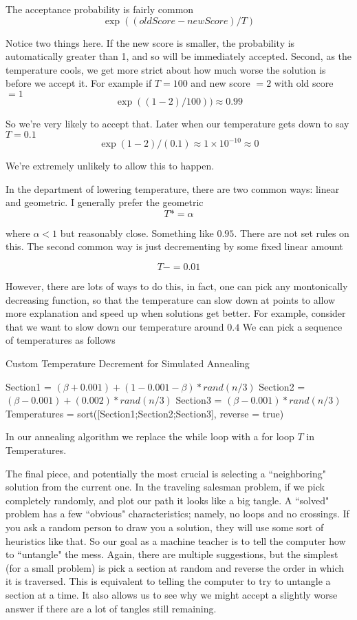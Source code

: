 \documentclass{article}
\theoremstyle{definition}
\theoremstyle{remark}
\begin{document}
The acceptance probability is fairly common
\[
\exp((oldScore - newScore)/T)
\]

Notice two things here.  If the new score is smaller, the probability is automatically greater than 1, and so will be immediately accepted.  Second, as the temperature cools, we get more strict about how much worse the solution is before we accept it.
For example if $T = 100$ and new score $=2$ with old score $=1$
\[
\exp((1-2)/100)) \approx 0.99
\]

So we're very likely to accept that.  Later when our temperature gets down to say $T = 0.1$
\[
\exp(1-2)/(0.1)  \approx 1\times 10^{-10} \approx 0
\]

We're extremely unlikely to allow this to happen.


In the department of lowering temperature, there are two common ways: linear and geometric.  I generally prefer the geometric
\[
T *= \alpha
\]

where $\alpha < 1$ but reasonably close.  Something like $0.95$.  There are not set rules on this.  The second common way is just decrementing by some fixed linear amount

\[
T -= 0.01
\]


However, there are lots of ways to do this, in fact, one can pick any montonically decreasing function, so that the temperature can slow down at points to allow more explanation and speed up when solutions get better. For example, consider that we want to slow down our temperature around $0.4$  We can pick a sequence of temperatures as follows

\begin{algorithm}
	\caption{Custom Temperature Decrement for Simulated Annealing}
	\label{Custom Temperature}
	\begin{algorithmic}[1]
		\State Section1 = $(\beta + 0.001) + (1 - 0.001 - \beta)*rand(n/3)$
		\State Section2 = $(\beta - 0.001) + (0.002)*rand(n/3)$
		\State Section3 = $(\beta - 0.001)*rand(n/3)$
		\State Temperatures = sort([Section1;Section2;Section3], reverse = true)
		\EndProcedure
	\end{algorithmic}	
\end{algorithm}   

In our annealing algorithm we replace the while loop with a for loop $T$ in Temperatures.


The final piece, and potentially the most crucial is selecting a ``neighboring" solution from the current one.  In the traveling salesman problem, if we pick completely randomly, and plot our path it looks like a big tangle.  A ``solved" problem has a few ``obvious" characteristics; namely, no loops and no crossings.  If you ask a random person to draw you a solution, they will use some sort of heuristics like that.  So our goal as a machine teacher is to tell the computer how to ``untangle" the mess.  Again, there are multiple suggestions, but the simplest (for a small problem) is pick a section at random and reverse the order in which it is traversed.  This is equivalent to telling the computer to try to untangle a section at a time.  It also allows us to see why we might accept a slightly worse answer if there are a lot of tangles still remaining.
\end{document}

